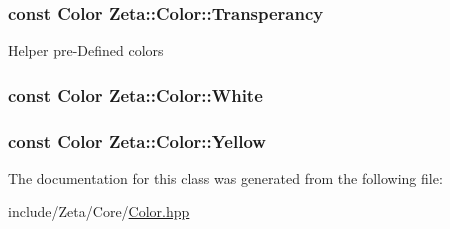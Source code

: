 \hypertarget{classZeta_1_1Color_a07cd49e6ad69b3581321718e2ae31086}{
\subsubsection[{Transperancy}]{\setlength{\rightskip}{0pt plus 5cm}const {\bf Color} Zeta\+::\+Color\+::\+Transperancy\hspace{0.3cm}{\ttfamily [static]}}}\label{classZeta_1_1Color_a07cd49e6ad69b3581321718e2ae31086}
Helper pre-\/\+Defined colors \hypertarget{classZeta_1_1Color_a58b9e675ed8534eaf2463cf73000d18a}{
\subsubsection[{White}]{\setlength{\rightskip}{0pt plus 5cm}const {\bf Color} Zeta\+::\+Color\+::\+White\hspace{0.3cm}{\ttfamily [static]}}}\label{classZeta_1_1Color_a58b9e675ed8534eaf2463cf73000d18a}
\hypertarget{classZeta_1_1Color_a0761150a2e61ee142822f4ac99a3e0bb}{
\subsubsection[{Yellow}]{\setlength{\rightskip}{0pt plus 5cm}const {\bf Color} Zeta\+::\+Color\+::\+Yellow\hspace{0.3cm}{\ttfamily [static]}}}\label{classZeta_1_1Color_a0761150a2e61ee142822f4ac99a3e0bb}


The documentation for this class was generated from the following file\+:\begin{DoxyCompactItemize}
\item 
include/\+Zeta/\+Core/\hyperlink{Color_8hpp}{Color.\+hpp}\end{DoxyCompactItemize}
